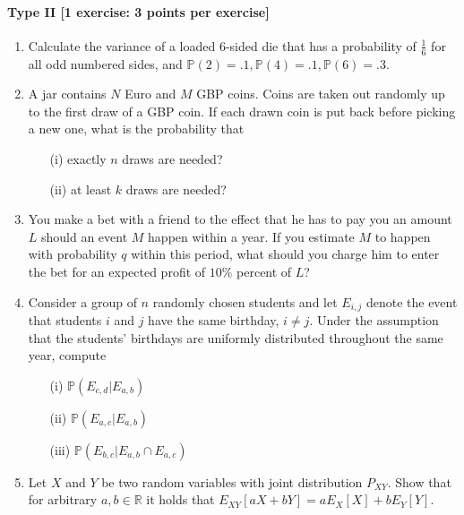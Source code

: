 \documentclass{article}
\begin{document}
\paragraph{Type II [1 exercise: 3 points per exercise]}
\begin{enumerate}
\item Calculate the variance of a loaded 6-sided die that has a probability of $\frac{1}{6}$ for all odd numbered sides, and $\mathbb{P}(2) = .1,  \mathbb{P}(4) = .1, \mathbb{P}(6) = .3$.
	\item A jar contains $N$ Euro and $M$ GBP coins. Coins are taken out randomly up to the first draw of a GBP coin. If each drawn coin is put back before picking a new one, what is the probability that
		\begin{itemize}
			\item[(i)] exactly $n$ draws are needed?
			\item[(ii)] at least $k$ draws are needed?
		\end{itemize}
	\item You make a bet with a friend to the effect that he has to pay you an amount $L$ should an event $M$ happen within a year. If you estimate $M$ to happen with probability $q$ within this period, what should you charge him to enter the bet for an expected profit of $10\%$ percent of $L$?
	\item Consider a group of $n$ randomly chosen students and let $E_{i,j}$ denote the event that students $i$ and $j$ have the same birthday, $i \neq j$. Under the assumption that the students' birthdays are uniformly distributed throughout the same year, compute
		\begin{itemize}
			\item[(i)] $\mathbb{P}(E_{c,d}|E_{a,b})$
			\item[(ii)] $\mathbb{P}(E_{a,c}|E_{a,b})$
			\item[(iii)] $\mathbb{P}(E_{b,c}|E_{a,b} \cap E_{a,c})$
		\end{itemize}
	\item Let $X$ and $Y$ be two random variables with joint distribution $P_{XY}$. Show that for arbitrary 		$a,b \in \mathbb{R}$ it holds that $E_{XY}[aX + bY] = a E_X[X] + b E_Y[Y].$

	\end{enumerate}
\end{document}
